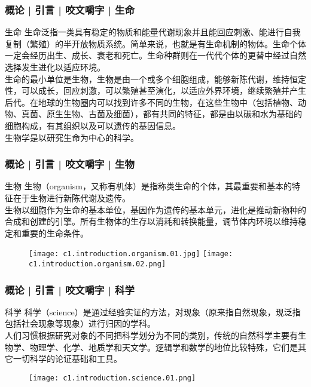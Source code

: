 \begin{frame}
  \frametitle{概论 | 引言 | 咬文嚼字 | 生命}
  \begin{block}{生命}
生命泛指一类具有稳定的物质和能量代谢现象并且能回应刺激、能进行自我复制（繁殖）的半开放物质系统。简单来说，也就是有生命机制的物体。生命个体一定会经历出生、成长、衰老和死亡。生命种群则在一代代个体的更替中经过自然选择发生进化以适应环境。\\
    \vspace{1em}
生命的最小单位是生物，生物是由一个或多个细胞组成，能够新陈代谢，维持恒定性，可以成长，回应刺激，可以繁殖甚至演化，以适应外界环境，继续繁殖并产生后代。在地球的生物圈内可以找到许多不同的生物，在这些生物中（包括植物、动物、真菌、原生生物、古菌及细菌），都有共同的特征，都是由以碳和水为基础的细胞构成，有其组织以及可以遗传的基因信息。\\
    \vspace{1em}
生物学是以研究生命为中心的科学。 
  \end{block}
\end{frame}

\begin{frame}
  \frametitle{概论 | 引言 | 咬文嚼字 | 生物}
  \begin{block}{生物}
    生物（organism，又称有机体）是指称类生命的个体，其最重要和基本的特征在于生物进行新陈代谢及遗传。\\
生物以细胞作为生命的基本单位，基因作为遗传的基本单元，进化是推动新物种的合成和创建的引擎。所有生物体的生存以消耗和转换能量，调节体内环境以维持稳定和重要的生命条件。
  \end{block}
  \pause
  \begin{figure}
    \centering
    \texttt{[image: c1.introduction.organism.01.jpg]}\qquad
    \texttt{[image: c1.introduction.organism.02.png]}
  \end{figure}
\end{frame}

\begin{frame}
  \frametitle{概论 | 引言 | 咬文嚼字 | 科学}
  \begin{block}{科学}
    科学（science）是通过经验实证的方法，对现象（原来指自然现象，现泛指包括社会现象等现象）进行归因的学科。\\
    \vspace{1em}
人们习惯根据研究对象的不同把科学划分为不同的类别，传统的自然科学主要有生物学、物理学、化学、地质学和天文学。逻辑学和数学的地位比较特殊，它们是其它一切科学的论证基础和工具。
  \end{block}
  \pause
  \begin{figure}
    \centering
    \texttt{[image: c1.introduction.science.01.png]}
  \end{figure}
\end{frame}

